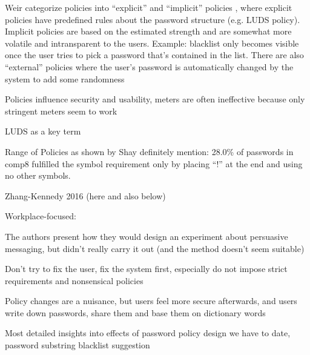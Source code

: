 	 
	
	

	
	
	Weir \etal categorize policies into ``explicit'' and ``implicit'' policies \cite{Weir2010MetricsPolicies}, where explicit policies have predefined rules about the password structure (e.g. LUDS policy). Implicit policies are based on the estimated strength and are somewhat more volatile and intransparent to the users. Example: blacklist only becomes visible once the user tries to pick a password that's contained in the list. There are also ``external'' policies where the user's password is automatically changed by the system to add some randomness
	
	
	Policies influence security and usability, meters are often ineffective because only stringent meters seem to work \cite{Ur2012HelpingUsersCreateBetterPasswords}
	
	LUDS as a key term \cite{Wheeler2016zxcvbn}
	
		
	Range of Policies as shown by Shay \cite{Shay2014CanLongPasswordsBeSecureAndUsable}
	definitely mention: 28.0\% of passwords in comp8 fulfilled the symbol requirement only by placing ``!'' at the end and using no other symbols. 
	
	Zhang-Kennedy 2016 (here and also below) \cite{ZhangKennedy2016RevisitingPasswordRules}
	
	
	Workplace-focused: 
	
	
	The authors present how they would design an experiment about persuasive messaging, but didn't really carry it out (and the method doesn't seem suitable) \cite{Zakaria2013DesigningEffectiveSecurityMessages}
	
	Don't try to fix the user, fix the system first, especially do not impose strict requirements and nonsensical policies \cite{Florencio2014AdministratorsGuide} 
	
	Policy changes are a nuisance, but users feel more secure afterwards, and users write down passwords, share them and base them on dictionary words 	\cite{Shay2010EncounteringPasswordRequirements}
	
	Most detailed insights into effects of password policy design we have to date, password substring blacklist suggestion \cite{Shay2016DesigningPasswordPolicies}
	
	\cite{Weir2010MetricsPolicies}
	
	\cite{Wang2015EmperorsPolicies}
	
	
	\cite{Florencio2010WhereDoPoliciesComeFrom}
	
